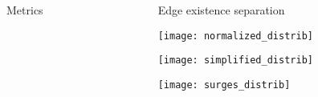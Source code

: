 \documentclass[final]{beamer}
\newlength{\onecolwid}
\newlength{\twocolwid}
\begin{document}
\begin{frame}[t]
\begin{columns}[t]
\begin{column}{\twocolwid}
\begin{columns}[t,totalwidth=\twocolwid]
\begin{column}{\onecolwid}
\begin{block}{Metrics}
\end{block}


\end{column} %

\begin{column}{\onecolwid}\vspace{-.6in} %


\begin{block}{Edge existence separation}
\begin{center}
  \texttt{[image: normalized\_distrib]}
\end{center}
\begin{center}
  \texttt{[image: simplified\_distrib]}
\end{center}
\begin{center}
  \texttt{[image: surges\_distrib]}
\end{center}


\end{block}


\end{column} %

\end{columns} %







\end{column}
\end{columns}
\end{frame}
\end{document}
